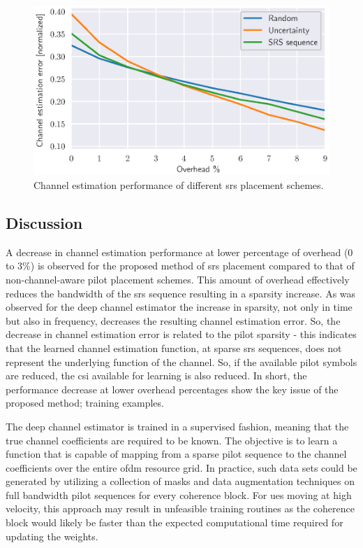 \begin{figure}
    \centering
    \includegraphics{chapters/part_uplink/figures/results/channel_estimation/overhead_comparison_scheme.eps}
    \caption{Channel estimation performance of different \gls{srs} placement schemes.}
    \label{fig:overhead_channel_estimation}
\end{figure}


\subsection{Discussion}
A decrease in channel estimation performance at lower percentage of overhead ($0$ to $3\%$) is observed for the proposed method of \gls{srs} placement compared to that of non-channel-aware pilot placement schemes. This amount of overhead effectively reduces the bandwidth of the \gls{srs} sequence resulting in a sparsity increase. As was observed for the deep channel estimator the increase in sparsity, not only in time but also in frequency, decreases the resulting channel estimation error. So, the decrease in channel estimation error is related to the pilot sparsity - this indicates that the learned channel estimation function, at sparse \gls{srs} sequences, does not represent the underlying function of the channel. So, if the available pilot symbols are reduced, the \gls{csi} available for learning is also reduced. In short, the performance decrease at lower overhead percentages show the key issue of the proposed method; training examples.

The deep channel estimator is trained in a supervised fashion, meaning that the true channel coefficients are required to be known. The objective is to learn a function that is capable of mapping from a sparse pilot sequence to the channel coefficients over the entire \gls{ofdm} resource grid. In practice, such data sets could be generated by utilizing a collection of masks and data augmentation techniques on full bandwidth pilot sequences for every coherence block. For \glspl{ue} moving at high velocity, this approach may result in unfeasible training routines as the coherence block would likely be faster than the expected computational time required for updating the weights.

